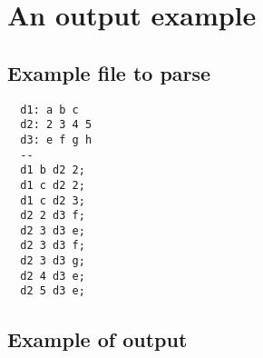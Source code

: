 \documentclass{rapport}
\begin{document}
\newpage

\appendix

\section{An output example}

\subsection{Example file to parse}
\label{sec:input_ex}
\begin{verbatim}
  d1: a b c 
  d2: 2 3 4 5
  d3: e f g h
  --
  d1 b d2 2;
  d1 c d2 2;
  d1 c d2 3;
  d2 2 d3 f;
  d2 3 d3 e;
  d2 3 d3 f;
  d2 3 d3 g;
  d2 4 d3 e;
  d2 5 d3 e;
\end{verbatim}


\subsection{Example of output}
\label{sec:output_ex}
\end{document}

